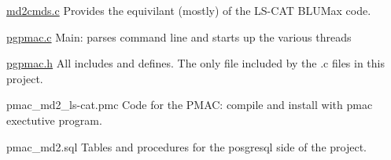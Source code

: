 \begin{DoxyPre}    \hyperlink{md2cmds_8c}{md2cmds.c}           Provides the equivilant (mostly) of the LS-CAT BLUMax code.\end{DoxyPre}



\begin{DoxyPre}    \hyperlink{pgpmac_8c}{pgpmac.c}            Main: parses command line and starts up the various threads\end{DoxyPre}



\begin{DoxyPre}    \hyperlink{pgpmac_8h}{pgpmac.h}            All includes and defines.  The only file included by the .c files in this project.\end{DoxyPre}



\begin{DoxyPre}    pmac\_md2\_ls-cat.pmc Code for the PMAC: compile and install with pmac exectutive program.\end{DoxyPre}



\begin{DoxyPre}    pmac\_md2.sql        Tables and procedures for the posgresql side of the project.
   \end{DoxyPre}


